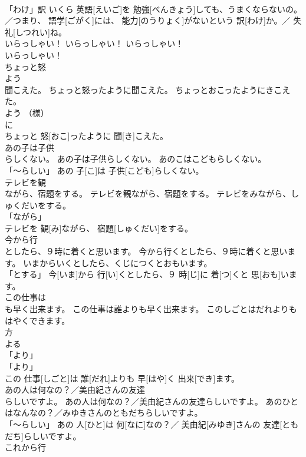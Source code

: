 \documentclass[8pt]{extreport}
\begin{document}
\begin{CJK}{UTF8}{min}
\\	「わけ」訳	いくら 英語[えいご]を 勉強[べんきょう]しても、うまくならないの。／つまり、 語学[ごがく]には、 能力[のうりょく]がないという 訳[わけ]か。／ 失礼[しつれい]ね。		
\\	いらっしゃい！	いらっしゃい！	いらっしゃい！	
\\	いらっしゃい！		
\\	ちょっと怒
\\	よう
\\	聞こえた。	ちょっと怒ったように聞こえた。	ちょっとおこったようにきこえた。	
\\	よう （様） 
\\	に 
\\	ちょっと 怒[おこ]ったように 聞[き]こえた。		
\\	あの子は子供
\\	らしくない。	あの子は子供らしくない。	あのこはこどもらしくない。	
\\	「～らしい」	あの 子[こ]は 子供[こども]らしくない。		
\\	テレビを観
\\	ながら、宿題をする。	テレビを観ながら、宿題をする。	テレビをみながら、しゅくだいをする。	
\\	「ながら」 
\\	テレビを 観[み]ながら、 宿題[しゅくだい]をする。		
\\	今から行
\\	としたら、９時に着くと思います。	今から行くとしたら、９時に着くと思います。	いまからいくとしたら、くじにつくとおもいます。	
\\	「とする」	今[いま]から 行[い]くとしたら、９ 時[じ]に 着[つ]くと 思[おも]います。		
\\	この仕事は
\\	も早く出来ます。	この仕事は誰よりも早く出来ます。	このしごとはだれよりもはやくできます。	
\\	方 
\\	よる 
\\	「より」 
\\	「より」 
\\	この 仕事[しごと]は 誰[だれ]よりも 早[はや]く 出来[でき]ます。		
\\	あの人は何なの？／美由紀さんの友達
\\	らしいですよ。	あの人は何なの？／美由紀さんの友達らしいですよ。	あのひとはなんなの？／みゆきさんのともだちらしいですよ。	
\\	「～らしい」	あの 人[ひと]は 何[なに]なの？／ 美由紀[みゆき]さんの 友達[ともだち]らしいですよ。		
\\	これから行

\end{CJK}
\end{document}
